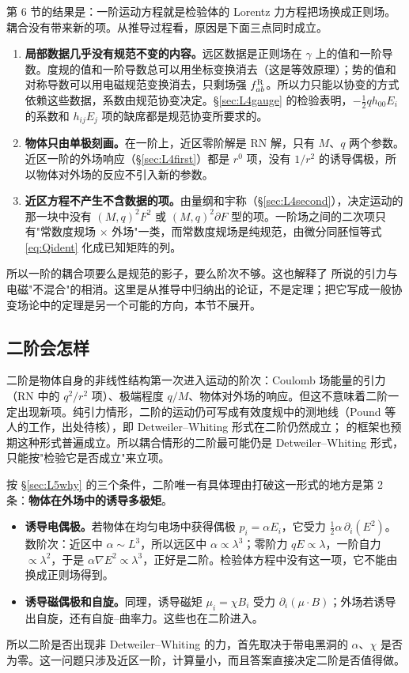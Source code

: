 \documentclass[11pt,a4paper]{ctexart}
\numberwithin{equation}{section}
\begin{document}
第 6 节的结果是：一阶运动方程就是检验体的 Lorentz 力方程把场换成正则场。耦合没有带来新的项。从推导过程看，原因是下面三点同时成立。
\begin{enumerate}
\item \textbf{局部数据几乎没有规范不变的内容。}远区数据是正则场在 $\gamma$ 上的值和一阶导数。度规的值和一阶导数总可以用坐标变换消去（这是等效原理）；势的值和对称导数可以用电磁规范变换消去，只剩场强 $f^{\rm R}_{ab}$。所以力只能以协变的方式依赖这些数据，系数由规范协变决定。\S\ref{sec:L4gauge} 的检验表明，$-\tfrac12qh_{00}E_i$ 的系数和 $h_{ij}E_j$ 项的缺席都是规范协变所要求的。
\item \textbf{物体只由单极刻画。}在一阶上，近区零阶解是 RN 解，只有 $M$、$q$ 两个参数。近区一阶的外场响应（\S\ref{sec:L4first}）都是 $r^0$ 项，没有 $1/r^2$ 的诱导偶极，所以物体对外场的反应不引入新的参数。
\item \textbf{近区方程不产生不含数据的项。}由量纲和宇称（\S\ref{sec:L4second}），决定运动的那一块中没有 $(M,q)^2F^2$ 或 $(M,q)^2\partial F$ 型的项。一阶场之间的二次项只有"常数度规场 $\times$ 外场"一类，而常数度规场是纯规范，由微分同胚恒等式 \eqref{eq:Qident} 化成已知矩阵的列。
\end{enumerate}
所以一阶的耦合项要么是规范的影子，要么阶次不够。这也解释了 \citet{LinzFriedmanWiseman2014b} 所说的引力与电磁"不混合"的相消。这里是从推导中归纳出的论证，不是定理；把它写成一般协变场论中的定理是另一个可能的方向，本节不展开。

\subsection{二阶会怎样}

二阶是物体自身的非线性结构第一次进入运动的阶次：Coulomb 场能量的引力（RN 中的 $q^2/r^2$ 项）、极端程度 $q/M$、物体对外场的响应。但这不意味着二阶一定出现新项。纯引力情形，二阶的运动仍可写成有效度规中的测地线（Pound 等人的工作，出处待核），即 Detweiler--Whiting 形式在二阶仍然成立；\citet{HarteBlancoFlanagan2025} 的框架也预期这种形式普遍成立。所以耦合情形的二阶最可能仍是 Detweiler--Whiting 形式，只能按"检验它是否成立"来立项。

按 \S\ref{sec:L5why} 的三个条件，二阶唯一有具体理由打破这一形式的地方是第 2 条：\textbf{物体在外场中的诱导多极矩}。
\begin{itemize}
\item \textbf{诱导电偶极。}若物体在均匀电场中获得偶极 $p_i=\alpha E_i$，它受力 $\tfrac12\alpha\,\partial_i(E^2)$。数阶次：近区中 $\alpha\sim L^3$，所以远区中 $\alpha\propto\lambda^3$；零阶力 $qE\propto\lambda$，一阶自力 $\propto\lambda^2$，于是 $\alpha\nabla E^2\propto\lambda^3$，正好是二阶。检验体方程中没有这一项，它不能由换成正则场得到。
\item \textbf{诱导磁偶极和自旋。}同理，诱导磁矩 $\mu_i=\chi B_i$ 受力 $\partial_i(\mu\cdot B)$；外场若诱导出自旋，还有自旋–曲率力。这些也在二阶进入。
\end{itemize}
所以二阶是否出现非 Detweiler--Whiting 的力，首先取决于带电黑洞的 $\alpha$、$\chi$ 是否为零。这一问题只涉及近区一阶，计算量小，而且答案直接决定二阶是否值得做。
\end{document}
